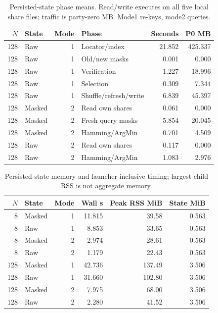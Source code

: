 \begin{table}[H]
\caption{Persisted-state phase means. Read/write executes on all five local share files; traffic is party-zero MB. Mode1 re-keys, mode2 queries.}
\label{tab:persisted_phases24}\centering\small
\setlength{\tabcolsep}{3pt}
\begin{tabular}{rlrlrr}
\toprule
$N$ & State & Mode & Phase & Seconds & P0 MB \\
\midrule
128 & Raw & 1 & Locator/index & 21.852 & 425.337 \\
128 & Raw & 1 & Old/new masks & 0.001 & 0.000 \\
128 & Raw & 1 & Verification & 1.227 & 18.996 \\
128 & Raw & 1 & Selection & 0.309 & 7.344 \\
128 & Raw & 1 & Shuffle/refresh/write & 6.839 & 45.397 \\
128 & Masked & 2 & Read own shares & 0.061 & 0.000 \\
128 & Masked & 2 & Fresh query masks & 5.854 & 20.045 \\
128 & Masked & 2 & Hamming/ArgMin & 0.701 & 4.509 \\
128 & Raw & 2 & Read own shares & 0.117 & 0.000 \\
128 & Raw & 2 & Hamming/ArgMin & 1.083 & 2.976 \\
\bottomrule
\end{tabular}
\end{table}

\begin{table}[H]
\caption{Persisted-state memory and launcher-inclusive timing; largest-child RSS is not aggregate memory.}
\label{tab:persisted_memory}\centering\small
\setlength{\tabcolsep}{3pt}
\begin{tabular}{rlrrrr}
\toprule
$N$ & State & Mode & Wall s & Peak RSS MiB & State MiB \\
\midrule
8 & Masked & 1 & 11.815 & 39.58 & 0.563 \\
8 & Raw & 1 & 8.853 & 33.65 & 0.563 \\
8 & Masked & 2 & 2.974 & 28.61 & 0.563 \\
8 & Raw & 2 & 1.179 & 22.43 & 0.563 \\
128 & Masked & 1 & 42.736 & 137.49 & 3.506 \\
128 & Raw & 1 & 31.660 & 102.80 & 3.506 \\
128 & Masked & 2 & 7.975 & 68.00 & 3.506 \\
128 & Raw & 2 & 2.280 & 41.52 & 3.506 \\
\bottomrule
\end{tabular}
\end{table}


